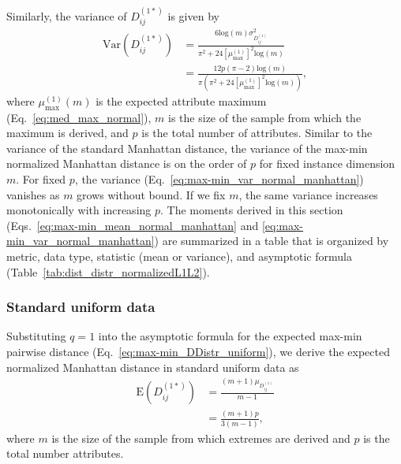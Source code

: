 \documentclass[aos]{imsart}
\begin{document}
Similarly, the variance of $D^{(1*)}_{ij}$ is given by
%
\begin{equation}\label{eq:max-min_var_normal_manhattan}
\begin{aligned}
\text{Var}\left(D^{(1*)}_{ij}\right) &= \frac{6\text{log}(m)\sigma^2_{D^{(1)}_{ij}}}{\pi^2 + 24\left[\mu^{(1)}_\text{max}\right]^2\text{log}(m)} \\
&= \frac{12p(\pi-2)\text{log}(m)}{\pi\left(\pi^2 + 24\left[\mu^{(1)}_\text{max}\right]^2\text{log}(m)\right)},
\end{aligned}
\end{equation}
%
where $\mu^{(1)}_\text{max}(m)$ is the expected attribute maximum (Eq.~\ref{eq:med_max_normal}), $m$ is the size of the sample from which the maximum is derived, and $p$ is the total number of attributes. Similar to the variance of the standard Manhattan distance, the variance of the max-min normalized Manhattan distance is on the order of $p$ for fixed instance dimension $m$. For fixed $p$, the variance (Eq.~\ref{eq:max-min_var_normal_manhattan}) vanishes as $m$ grows without bound. If we fix $m$, the same variance increases monotonically with increasing $p$. The moments derived in this section (Eqs.~\ref{eq:max-min_mean_normal_manhattan} and \ref{eq:max-min_var_normal_manhattan}) are summarized in a table that is organized by metric, data type, statistic (mean or variance), and asymptotic formula (Table~\ref{tab:dist_distr_normalizedL1L2}).

\subsubsection{Standard uniform data}

Substituting $q=1$ into the asymptotic formula for the expected max-min pairwise distance (Eq.~\ref{eq:max-min_DDistr_uniform}), we derive the expected normalized Manhattan distance in standard uniform data as
%
\begin{equation}\label{eq:max-min_mean_uniform_manhattan}
\begin{aligned}
\text{E}\left(D^{(1*)}_{ij}\right) &= \frac{(m+1)\mu_{D^{(1)}_{ij}}}{m-1} \\
&= \frac{(m+1)p}{3(m-1)},
\end{aligned}
\end{equation}
%
where $m$ is the size of the sample from which extremes are derived and $p$ is the total number attributes.
\end{document}
